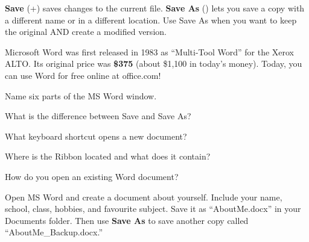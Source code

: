 \begin{notebox}
\textbf{Save} (+) saves changes to the current file. \textbf{Save As} () lets you save a copy with a different name or in a different location. Use Save As when you want to keep the original AND create a modified version.
\end{notebox}


\begin{funfact}
Microsoft Word was first released in 1983 as ``Multi-Tool Word'' for the Xerox ALTO. Its original price was \textbf{\$375} (about \$1,100 in today's money). Today, you can use Word for free online at office.com!
\end{funfact}

\begin{reviewqs}
  \item Name six parts of the MS Word window.
  \item What is the difference between Save and Save As?
  \item What keyboard shortcut opens a new document?
  \item Where is the Ribbon located and what does it contain?
  \item How do you open an existing Word document?
\end{reviewqs}

\begin{challenge}
Open MS Word and create a document about yourself. Include your name, school, class, hobbies, and favourite subject. Save it as ``AboutMe.docx'' in your Documents folder. Then use \textbf{Save As} to save another copy called ``AboutMe\_Backup.docx.''
\end{challenge}
